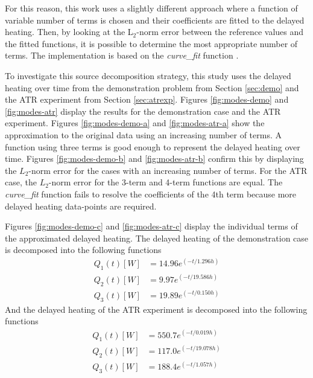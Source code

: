 For this reason, this work uses a slightly different approach where a function of variable number of terms is chosen and their coefficients are fitted to the delayed heating.
Then, by looking at the L$_2$-norm error between the reference values and the fitted functions, it is possible to determine the most appropriate number of terms.
The implementation is based on the \textit{curve\_fit} function \cite{2020SciPy-NMeth}.

To investigate this source decomposition strategy, this study uses the delayed heating over time from the demonstration problem from Section \ref{sec:demo} and the ATR experiment from Section \ref{sec:atrexp}.
Figures \ref{fig:modes-demo} and \ref{fig:modes-atr} display the results for the demonstration case and the ATR experiment.
Figures \ref{fig:modes-demo-a} and \ref{fig:modes-atr-a} show the approximation to the original data using an increasing number of terms.
A function using three terms is good enough to represent the delayed heating over time.
Figures \ref{fig:modes-demo-b} and \ref{fig:modes-atr-b} confirm this by displaying the $L_2$-norm error for the cases with an increasing number of terms.
For the ATR case, the $L_2$-norm error for the 3-term and 4-term functions are equal.
The \textit{curve\_fit} function fails to resolve the coefficients of the 4th term because more delayed heating data-points are required.

Figures \ref{fig:modes-demo-c} and \ref{fig:modes-atr-c} display the individual terms of the approximated delayed heating.
The delayed heating of the demonstration case is decomposed into the following functions
\begin{align}
Q_1(t)[W] &= 14.96 e^{(-t / 1.296 h)}  \\
Q_2(t)[W] &=  9.97 e^{(-t / 19.586 h)}  \\
Q_3(t)[W] &= 19.89 e^{(-t / 0.150 h)}
\end{align}
And the delayed heating of the ATR experiment is decomposed into the following functions
\begin{align}
Q_1(t)[W] &= 550.7 e^{(-t / 0.019 h)}  \\
Q_2(t)[W] &= 117.0 e^{(-t / 19.078 h)}  \\
Q_3(t)[W] &= 188.4 e^{(-t / 1.057 h)}
\end{align}

